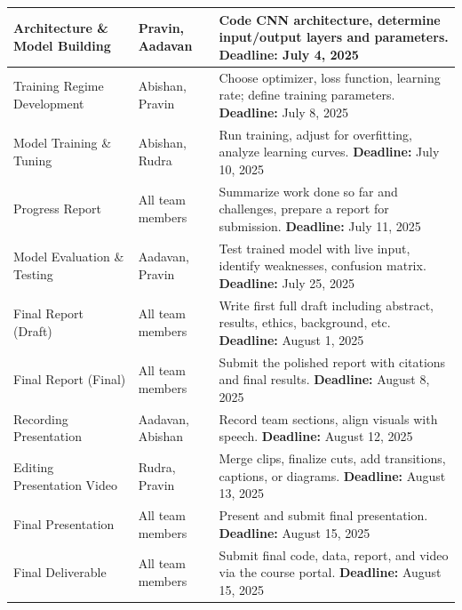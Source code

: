 \documentclass{article} %
\begin{document}
\begin{table}[H]
\begin{tabular}{|p{4.5cm}|p{3.5cm}|p{6cm}|}
Architecture \& Model Building & Pravin, Aadavan & Code CNN architecture, determine input/output layers and parameters. \newline \textbf{Deadline:} July 4, 2025 \\ \hline
Training Regime Development & Abishan, Pravin & Choose optimizer, loss function, learning rate; define training parameters. \newline \textbf{Deadline:} July 8, 2025 \\ \hline
Model Training \& Tuning & Abishan, Rudra & Run training, adjust for overfitting, analyze learning curves. \newline \textbf{Deadline:} July 10, 2025 \\ \hline
Progress Report & All team members & Summarize work done so far and challenges, prepare a report for submission. \newline \textbf{Deadline:} July 11, 2025 \\ \hline
Model Evaluation \& Testing & Aadavan, Pravin & Test trained model with live input, identify weaknesses, confusion matrix. \newline \textbf{Deadline:} July 25, 2025 \\ \hline
Final Report (Draft) & All team members & Write first full draft including abstract, results, ethics, background, etc. \newline \textbf{Deadline:} August 1, 2025 \\ \hline
Final Report (Final) & All team members & Submit the polished report with citations and final results. \newline \textbf{Deadline:} August 8, 2025 \\ \hline
Recording Presentation & Aadavan, Abishan & Record team sections, align visuals with speech. \newline \textbf{Deadline:} August 12, 2025 \\ \hline
Editing Presentation Video & Rudra, Pravin & Merge clips, finalize cuts, add transitions, captions, or diagrams. \newline \textbf{Deadline:} August 13, 2025 \\ \hline
Final Presentation & All team members & Present and submit final presentation. \newline \textbf{Deadline:} August 15, 2025 \\ \hline
Final Deliverable & All team members & Submit final code, data, report, and video via the course portal. \newline \textbf{Deadline:} August 15, 2025 \\ \hline
\end{tabular}
\end{table}
\end{document}
